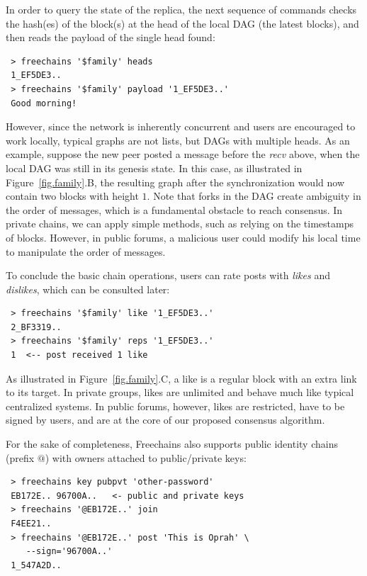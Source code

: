\documentclass[10pt,journal,compsoc]{IEEEtran}
\newcommand{\FC}       {Freechains\xspace}
\begin{document}
In order to query the state of the replica, the next sequence of commands
checks the hash(es) of the block(s) at the head of the local DAG (the latest
blocks), and then reads the payload of the single head found:

{\footnotesize
\begin{verbatim}
 > freechains '$family' heads
 1_EF5DE3..
 > freechains '$family' payload '1_EF5DE3..'
 Good morning!
\end{verbatim}
}

However, since the network is inherently concurrent and users are encouraged to
work locally, typical graphs are not lists, but DAGs with multiple heads.
As an example, suppose the new peer posted a message before the \emph{recv}
above, when the local DAG was still in its genesis state.
In this case, as illustrated in Figure~\ref{fig.family}.B, the resulting graph
after the synchronization would now contain two blocks with height $1$.
%
Note that forks in the DAG create ambiguity in the order of messages, which is
a fundamental obstacle to reach consensus.
In private chains, we can apply simple methods, such as relying on the
timestamps of blocks.
However, in public forums, a malicious user could modify his local time to
manipulate the order of messages.

To conclude the basic chain operations, users can rate posts with \emph{likes}
and \emph{dislikes}, which can be consulted later:

{\footnotesize
\begin{verbatim}
 > freechains '$family' like '1_EF5DE3..'
 2_BF3319..
 > freechains '$family' reps '1_EF5DE3..'
 1  <-- post received 1 like
\end{verbatim}
}

As illustrated in Figure~\ref{fig.family}.C, a like is a regular block with an
extra link to its target.
In private groups, likes are unlimited and behave much like typical centralized
systems.
In public forums, however, likes are restricted, have to be signed by users,
and are at the core of our proposed consensus algorithm.

For the sake of completeness, \FC also supports public identity chains (prefix
$@$) with owners attached to public/private keys:

{\footnotesize
\begin{verbatim}
 > freechains key pubpvt 'other-password'
 EB172E.. 96700A..   <- public and private keys
 > freechains '@EB172E..' join
 F4EE21..
 > freechains '@EB172E..' post 'This is Oprah' \
    --sign='96700A..'
 1_547A2D..
\end{verbatim}
}
\end{document}
